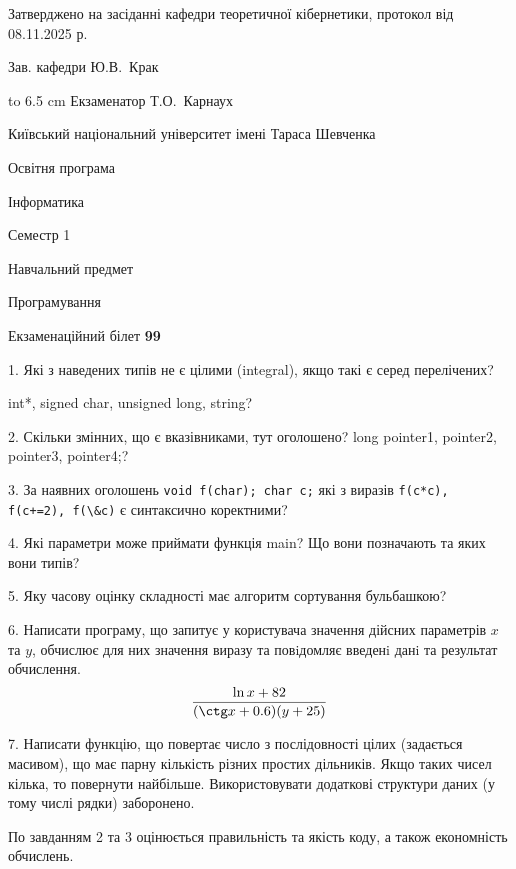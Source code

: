 \documentclass[12pt, ukrainian]{article}
\def\code#1{\Verb!#1!}
\begin{document}
{\smallskip\smallskip \begin {scriptsize} Затверджено на засіданні кафедри теоретичної кібернетики, протокол   від   08.11.2025 р.\par\smallskip\smallskip\smallskip\smallskip
{\parbox {6.5 cm} {Зав. кафедри \dotfill Ю.В.~Крак}}\hspace {0.7cm} {\hbox to 6.5 cm { Екзаменатор \dotfill Т.О.~Карнаух}} \end{scriptsize}}
\newpage
{{\begin {scriptsize}\par
{ \center  Київський національний університет імені Тараса Шевченка \par}
{\parbox {5 cm}{Освітня програма \hfill}{\parbox {7 cm}{Інформатика\hfill}}\parbox {6 cm}{\hfill Семестр 1}}\par
{\parbox {5 cm} {Навчальний предмет \hfill}\parbox {7 cm}{Програмування \hfill}\parbox {6cm}{\hfill}\par}\vspace{-15pt} \end{scriptsize}}{\center Екзаменаційний білет \No \textbf { 99 }\par}}
{%
1. Які з наведених типів не є цілими (integral), якщо такі є серед перелічених?

int*, signed char, unsigned long, string?
\par
\vspace{2mm}
2. Скільки змінних, що є вказівниками, тут оголошено?
long pointer1, pointer2, pointer3, pointer4;?
\par
\vspace{2mm}
3. За наявних оголошень \code{void f(char); char c;} які з виразів \code{f(c*c), f(c+=2), f(\&c)} є синтаксично коректними?
\par
\vspace{2mm}
4. Які параметри може приймати функція main? Що вони позначають та яких вони типів?
\par
\vspace{2mm}
5. Яку часову оцінку складності має алгоритм сортування бульбашкою?
\par
\vspace{2mm}
6. Написати програму, що запитує у користувача значення дійсних параметрів $x$ та $y$, обчислює для них значення виразу та повiдомляє введенi данi та результат обчислення.
$$\frac{\ln x + 82}{(\ctg x + 0.6) (y + 25)}$$ 

\par
7. Написати функцію, що повертає число з послідовності цілих (задається масивом), що має парну кількість різних простих дільників. Якщо таких чисел кілька, то повернути найбільше. Використовувати додаткові структури даних (у тому числі рядки) заборонено.

По завданням 2 та 3 оцінюється правильність та якість коду, а також економність обчислень.

}
\end{document}
